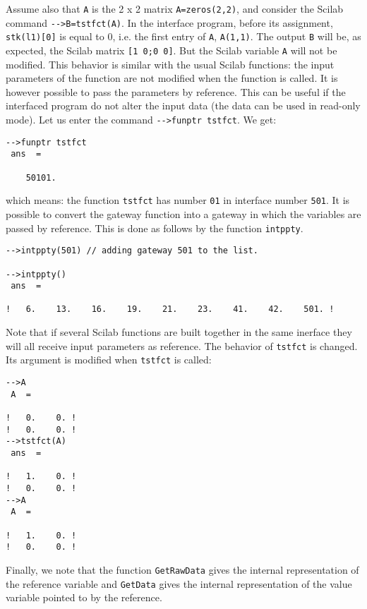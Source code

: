Assume also that \verb!A! is the 2 x 2 matrix \verb!A=zeros(2,2)!, 
and consider the Scilab command \verb!-->B=tstfct(A)!. In the interface
program, before its assignment, \verb!stk(l1)[0]! is equal to 0, i.e. the first
entry of \verb!A!, {\tt A(1,1)}. 
The output {\tt B} will be, as expected, the Scilab matrix \verb![1 0;0 0]!.
But the Scilab variable {\tt A} will not be modified. This behavior is similar
with the usual Scilab functions: the input parameters of the function are
not modified when the  function is called.
It is however possible to pass the parameters by reference. This can be useful
if the interfaced program do not alter the input data (the data can be used
in read-only mode).
Let us enter the command \verb!-->funptr tstfct!. We get:
\begin{verbatim}
-->funptr tstfct
 ans  =
 
    50101.  
\end{verbatim}
which means: the function \verb!tstfct! has number \verb!01! in interface
number \verb!501!.
It is possible to convert the gateway function into a gateway in which the 
variables are passed by reference. This is done as follows 
by the function \verb!intppty!.
\begin{verbatim}
-->intppty(501) // adding gateway 501 to the list.
 
-->intppty()   
 ans  =
 
!   6.    13.    16.    19.    21.    23.    41.    42.    501. !
\end{verbatim}
Note that if several Scilab functions are built together in the same
inerface they will all receive input parameters as reference.
The behavior of \verb!tstfct! is changed. Its argument is modified when
\verb!tstfct! is called:
\begin{verbatim}
-->A
 A  =
 
!   0.    0. !
!   0.    0. !
-->tstfct(A)
 ans  =
 
!   1.    0. !
!   0.    0. !
-->A
 A  =
 
!   1.    0. !
!   0.    0. !
\end{verbatim}
Finally, we note that the function {\tt GetRawData} gives the 
internal representation of the reference variable and {\tt GetData}
gives the internal representation of the value variable pointed to
by the reference.
